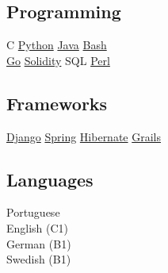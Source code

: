 \documentclass[]{willianpaixao-resume}
\begin{document}
\begin{minipage}[t]{0.34\textwidth}
\subsection{Programming}
C\textbullet
\href{http://www.python.org}{Python}\textbullet{}
\href{https://www.oracle.com/java/}{Java}\textbullet{}
\href{https://www.gnu.org/software/bash/}{Bash}\\
\href{https://go.dev/}{Go}\textbullet{}
\href{https://soliditylang.org/}{Solidity}\textbullet{}
SQL\textbullet{}
\href{https://www.perl.org/}{Perl}
\sectionsep

\subsection{Frameworks}
\href{https://www.djangoproject.com/}{Django}\textbullet{}
\href{https://spring.io/}{Spring}\textbullet{}
\href{https://hibernate.org/}{Hibernate}\textbullet{}
\href{https://grails.org/}{Grails}
\sectionsep

\subsection{Languages}
Portuguese\\
English (C1)\\
German (B1)\\
Swedish (B1)


\end{minipage} 
\hfill
\end{document}
